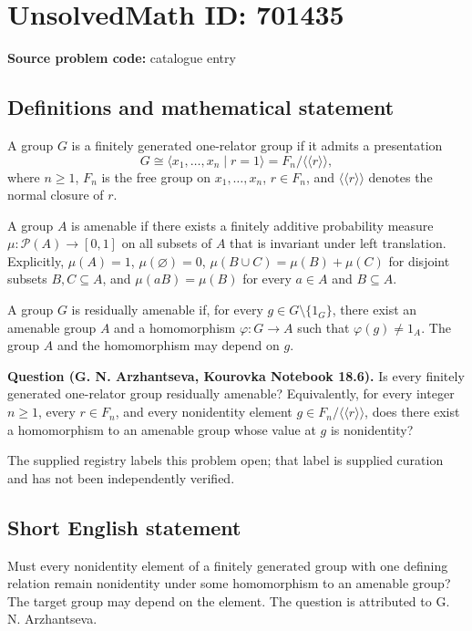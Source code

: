 \documentclass[11pt]{article}
\begin{document}
\section*{UnsolvedMath ID: 701435}
\textbf{Source problem code:} catalogue entry
\subsection{Definitions and mathematical statement}
A group \(G\) is a finitely generated one-relator group if it admits a presentation
\[
G\cong \langle x_1,\ldots,x_n\mid r=1\rangle
=F_n/\langle\!\langle r\rangle\!\rangle,
\]
where \(n\geq 1\), \(F_n\) is the free group on \(x_1,\ldots,x_n\), \(r\in F_n\), and \(\langle\!\langle r\rangle\!\rangle\) denotes the normal closure of \(r\).

A group \(A\) is amenable if there exists a finitely additive probability measure \(\mu:\mathcal P(A)\to[0,1]\) on all subsets of \(A\) that is invariant under left translation. Explicitly, \(\mu(A)=1\), \(\mu(\varnothing)=0\), \(\mu(B\cup C)=\mu(B)+\mu(C)\) for disjoint subsets \(B,C\subseteq A\), and \(\mu(aB)=\mu(B)\) for every \(a\in A\) and \(B\subseteq A\).

A group \(G\) is residually amenable if, for every \(g\in G\setminus\{1_G\}\), there exist an amenable group \(A\) and a homomorphism \(\varphi:G\to A\) such that \(\varphi(g)\neq 1_A\). The group \(A\) and the homomorphism may depend on \(g\).

\textbf{Question (G. N. Arzhantseva, Kourovka Notebook 18.6).} Is every finitely generated one-relator group residually amenable? Equivalently, for every integer \(n\geq 1\), every \(r\in F_n\), and every nonidentity element \(g\in F_n/\langle\!\langle r\rangle\!\rangle\), does there exist a homomorphism to an amenable group whose value at \(g\) is nonidentity?

The supplied registry labels this problem open; that label is supplied curation and has not been independently verified.
\subsection{Short English statement}
Must every nonidentity element of a finitely generated group with one defining relation remain nonidentity under some homomorphism to an amenable group? The target group may depend on the element. The question is attributed to G. N. Arzhantseva.
\end{document}
